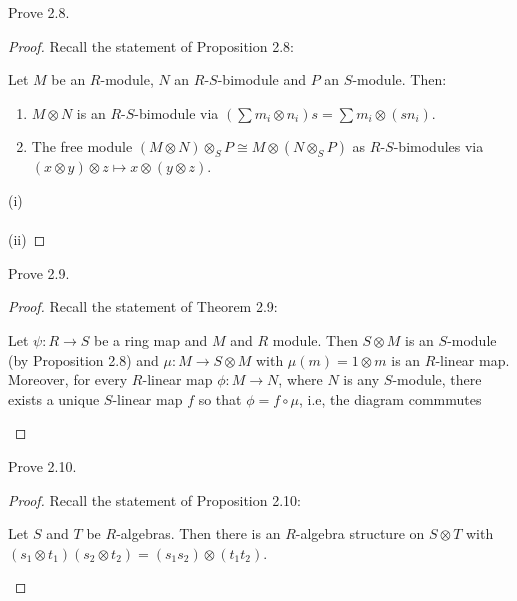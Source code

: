 \newpage
\begin{problem}
Prove 2.8.
\end{problem}
\begin{proof}
Recall the statement of Proposition 2.8:
\begin{proposition*}
Let $M$ be an $R$-module, $N$ an $R$-$S$-bimodule and $P$ an
$S$-module. Then:
\begin{enumerate}[noitemsep,label=(\alph*)]
\item $M\otimes N$ is an $R$-$S$-bimodule via $\left(\sum
    m_i\otimes n_i\right)s=\sum m_i\otimes (sn_i).$
\item The free module $(M\otimes N)\otimes_S P\cong M\otimes
  (N\otimes_S P)$ as $R$-$S$-bimodules via $(x\otimes y)\otimes
  z\mapsto x\otimes (y\otimes z)$.
\end{enumerate}
\end{proposition*}
(i)
\\\\
(ii)
\end{proof}
\newpage
\begin{problem}
Prove 2.9.
\end{problem}
\begin{proof}
Recall the statement of Theorem 2.9:
\begin{theorem*}
Let $\psi\colon R\to S$ be a ring map and $M$ and $R$
module. Then $S\otimes M$ is an $S$-module (by Proposition
2.8) and $\mu\colon M\to S\otimes M$ with $\mu(m)=1\otimes m$
is an $R$-linear map. Moreover, for every $R$-linear map
$\phi\colon M\to N$, where $N$ is any $S$-module, there exists a
unique $S$-linear map $f$ so that $\phi=f\circ\mu$, i.e, the
diagram commmutes
\end{theorem*}
\end{proof}
\newpage
\begin{problem}
Prove 2.10.
\end{problem}
\begin{proof}
Recall the statement of Proposition 2.10:
\begin{proposition*}
Let $S$ and $T$ be $R$-algebras. Then there is an $R$-algebra
structure on $S\otimes T$ with $(s_1\otimes t_1)(s_2\otimes
t_2)=(s_1s_2)\otimes (t_1t_2)$.
\end{proposition*}
\end{proof}

